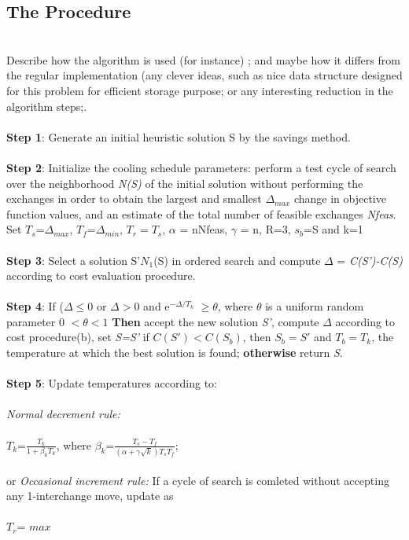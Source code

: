 \documentclass[11pt]{article}
\newcommand{\<}{\langle}
\renewcommand{\>}{\rangle}
\theoremstyle{definition}
\begin{document}
\subsection{The Procedure}
\\Describe how the algorithm is used  (for instance) ; and maybe how it differs from the regular implementation (any clever ideas, such as nice data structure designed for this problem for efficient storage purpose; or any interesting reduction
in the algorithm steps;.\\
\\\textbf{Step 1}: Generate an initial heuristic solution S by the savings method.\\
\\\textbf{Step 2}: Initialize the cooling schedule parameters: 
perform a test cycle of search over the neighborhood \textit{N(S)} of the initial solution without performing the exchanges in order to obtain the largest and smallest $\Delta_{max}$ change in objective function values, and an estimate of the total number of feasible exchanges \textit{Nfeas}.
Set {$T_s$=$\Delta_{max}$, $T_f$=$\Delta_{min}$, $T_r=T_s$, $\alpha$ = n\times Nfeas, $\gamma$ = n, R=3, $s_b$=S and k=1}\\
\\\textbf{Step 3}: Select a solution S'\in$N_1$(S) in ordered search and compute $\Delta$ = \textit{C(S')-C(S)} according to cost evaluation procedure.\\
\\\textbf{Step 4}: If {($\Delta \leq 0$ or $\Delta > 0$ and e$^{-\Delta/T_k}$ $\geq \theta$, where $\theta$ is a uniform random parameter 0 $< \theta <1$}
\textbf{Then} accept the new solution \textit{S'}, compute $\Delta$ according to cost procedure(b), set \textit{S=S'}
    if \textit{$C(S')<C(S_b)$}, then \textit{$S_b=S'$} and \textit{$T_b = T_k$}, the temperature at which the best solution is found;
    \textbf{otherwise} return \textit{S}.\\
\\\textbf{Step 5}: Update temperatures according to:\\ 
\\\textit{Normal decrement rule:}\\
\\$T_{k}$=$\frac{T_{k}}{1+\beta_{k}T_{k}}$, where $\beta_{k}$=$\frac{T_{s}-T_{f}}{(\alpha + \gamma \sqrt{k}) T_{s}T_{f}}$;\\
\\or \textit{Occasional increment rule:} If a cycle of search is comleted without accepting any 1-interchange move, update as\\
\\ $T_{r}$= $max $
\end{document}
